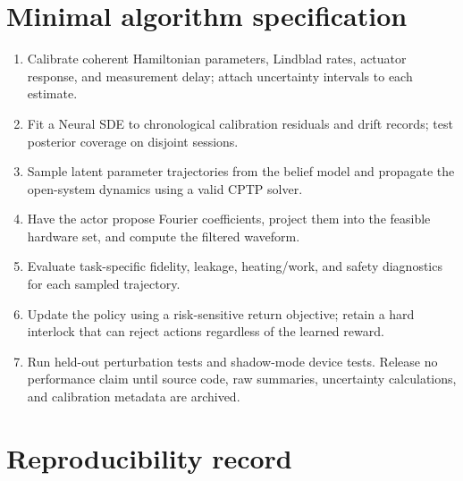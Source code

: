\documentclass[10pt,twoside]{article}
\begin{document}
\section{Minimal algorithm specification}

\begin{enumerate}[label=\textbf{Step \arabic*:},leftmargin=2.4em]
\item Calibrate coherent Hamiltonian parameters, Lindblad rates, actuator response, and measurement delay; attach uncertainty intervals to each estimate.
\item Fit a Neural SDE to chronological calibration residuals and drift records; test posterior coverage on disjoint sessions.
\item Sample latent parameter trajectories from the belief model and propagate the open-system dynamics using a valid CPTP solver.
\item Have the actor propose Fourier coefficients, project them into the feasible hardware set, and compute the filtered waveform.
\item Evaluate task-specific fidelity, leakage, heating/work, and safety diagnostics for each sampled trajectory.
\item Update the policy using a risk-sensitive return objective; retain a hard interlock that can reject actions regardless of the learned reward.
\item Run held-out perturbation tests and shadow-mode device tests. Release no performance claim until source code, raw summaries, uncertainty calculations, and calibration metadata are archived.
\end{enumerate}

\section{Reproducibility record}
\end{document}
